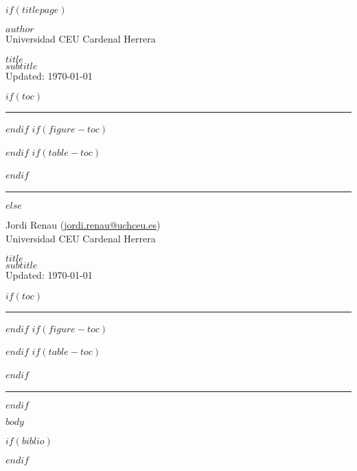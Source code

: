 \documentclass[$fontsize$,a4paper,twoside,onecolumn]{scrartcl}
\subtitle{$subtitle$}
\date{$date$}
\newcommand{\mititulo}{ $title$ }
\newcommand{\misubtitulo}{ $subtitle$ }
\newcommand{\ELautor}{$author$}
\begin{document}
	
$if(titlepage)$
	\begin{titlepage}
		\begin{flushright}
			\large 	\ELautor \\
			
   			Universidad CEU Cardenal Herrera %

		\Huge 
		\mititulo \\[0.5cm]
		\huge
		\misubtitulo \\[0.5cm]
  \small Updated: \today
	\end{flushright}
	\small
	$if(toc)$
	\hrule
	\tableofcontents 
	$endif$
	$if(figure-toc)$
	\listoffigures
	$endif$
	$if(table-toc)$
	\listoftables
	\normalsize
	$endif$
	~
	\hrule
	
	\end{titlepage}

$else$
		\begin{flushright}
				\thispagestyle{empty}
				\large
				Jordi Renau (\href{mailto:jordi.renau@uchceu.es}{jordi.renau@uchceu.es}) \\
				Universidad CEU Cardenal Herrera %
			
				\Huge 
				\mititulo \\[0.5cm]
				\huge
				\misubtitulo \\[0.5cm]
				\small Updated: \today
	\end{flushright}
	$if(toc)$
		\small
		\hrule
		\renewcommand{\contentsname}{Contenidos}
		\tableofcontents 
		$endif$
		$if(figure-toc)$
		\renewcommand{\listfigurename}{Lista de figuras}
		\listoffigures
		$endif$
		$if(table-toc)$
		\renewcommand{\listtablename}{Lista de tablas}
		\listoftables
		\normalsize
		$endif$
		~
		\hrule
$endif$




$body$

$if(biblio)$
	
	
$endif$
\end{document}
